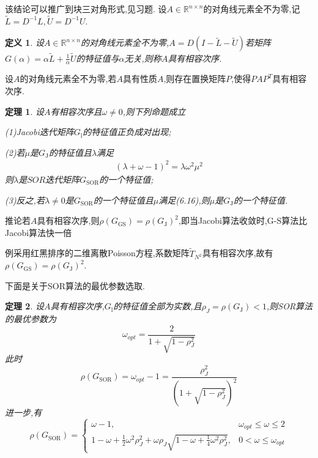 \documentclass[notheorems,serif]{beamer}
\newcommand{\hei}[1]{{\HEI#1}}
\newtheorem{theorem}{\hei{定理}}
\newtheorem{definition}{\hei{定义}}
\begin{document}
\begin{frame}
该结论可以推广到块三对角形式,见习题.
设$A \in \mathbb{R}^{n \times n}$的对角线元素全不为零,记$\tilde{L}=D^{-1} L, \tilde{U}=D^{-1} U$.

\begin{definition}
设$A \in \mathbb{R}^{n \times n}$的对角线元素全不为零,$A=D(I-\tilde{L}-\tilde{U})$若矩阵$G(\alpha)=\alpha \tilde{L}+\frac{1}{\alpha} \tilde{U}$的特征值与$\alpha$无关,则称$A$具有相容次序.\\
\end{definition}

设$A$的对角线元素全不为零,若$A$具有性质$A$,则存在置换矩阵$P$,使得$P A P^{T}$具有相容次序.\\

\end{frame}

\begin{frame}
\begin{theorem}
设$A$有相容次序且$\omega \neq 0$,则下列命题成立

(1)Jacobi迭代矩阵$G_{\mathrm{l}}$的特征值正负成对出现;

(2)若$\mu$是$G_{\mathrm{J}}$的特征值且$\lambda$满足
\begin{align}
	(\lambda+\omega-1)^{2}=\lambda \omega^{2} \mu^{2}\tag{6.16}
\end{align}
则$\lambda$是$SOR$迭代矩阵$G_{\mathrm{SOR}}$的一个特征值;

(3)反之,若$\lambda \neq 0$是$G_{\mathrm{SOR}}$的一个特征值且$\mu$满足(6.16),则$\mu$是$G_{\mathrm{J}}$的一个特征值.

\end{theorem}

{\color{blue}推论}\quad 若$A$具有相容次序,则$\rho\left(G_{\mathrm{GS}}\right)=\rho\left(G_{\mathrm{J}}\right)^{2}$,即当Jacobi算法收敛时,G-S算法比Jacobi算法快一倍
\end{frame}

\begin{frame}
{\color{blue}例}\qquad 采用红黑排序的二维离散Poisson方程,系数矩阵$\tilde{T}_{N^{2}}$具有相容次序,故有$\rho\left(G_{\mathrm{GS}}\right)=\rho\left(G_{\mathrm{J}}\right)^{2}$.
\end{frame}

\begin{frame}
下面是关于SOR算法的最优参数选取.
\begin{theorem}
设$A$具有相容次序,$G_{\mathrm{l}}$的特征值全部为实数,且$\rho_{J}=\rho\left(G_{\mathrm{J}}\right)<1$,则SOR算法的最优参数为
$$
\omega_{o p t}=\frac{2}{1+\sqrt{1-\rho_{J}^{2}}}
$$
此时
$$
\rho\left(G_{\mathrm{SOR}}\right)=\omega_{o p t}-1=\frac{\rho_{J}^{2}}{\left(1+\sqrt{1-\rho_{J}^{2}}\right)^{2}}
$$
进一步,有
$$
\rho\left(G_{\mathrm{SOR}}\right)=\left\{\begin{array}{ll}{\omega-1,} & {\omega_{o p t} \leq \omega \leq 2} \\ {1-\omega+\frac{1}{2} \omega^{2} \rho_{J}^{2}+\omega \rho_{J} \sqrt{1-\omega+\frac{1}{4} \omega^{2} \rho_{J}^{2}},} & {0<\omega \leq \omega_{o p t}}\end{array}\right.
$$
\end{theorem}
\end{frame}
\end{document}
